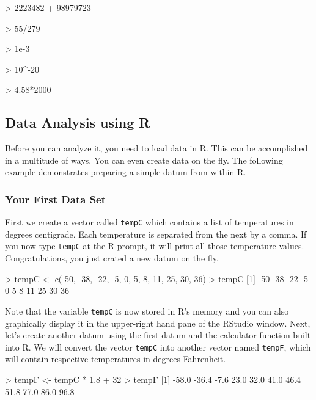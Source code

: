 \documentclass[11pt,twosided]{article}
\begin{document}
\begin{tcolorbox}[boxrule=0.5pt]
\begin{code}
> 2223482 + 98979723

> 55/279

> 1e-3

> 10^-20

> 4.58*2000

\end{code}
\end{tcolorbox}
\vspace{2ex}

\subsection{Data Analysis using R}

Before you can analyze it, you need to load data in R.  This can be accomplished in a multitude of ways.  You can even create data on the fly.  The following example demonstrates preparing a simple datum from within R.  

\subsubsection{Your First Data Set}
First we create a vector called {\tt tempC} which contains a list of temperatures in degrees centigrade.  Each temperature is separated from the next by a comma.  If you now type {\tt tempC} at the R prompt, it will print all those temperature values.  Congratulations, you just crated a new datum on the fly.\\

\begin{tcolorbox}[boxrule=0.5pt]
\begin{code}
> tempC <- c(-50, -38, -22, -5, 0, 5, 8, 11, 25, 30, 36)
> tempC
[1] -50 -38 -22  -5   0   5   8  11  25  30  36
\end{code}
\end{tcolorbox}
\vspace{2ex}

Note that the variable {\tt tempC} is now stored in R's memory and you can also graphically display it in the upper-right hand pane of the RStudio window.  Next, let's create another datum using the first datum and the calculator function built into R. We will convert the vector {\tt tempC} into another vector named {\tt tempF}, which will contain respective temperatures in degrees Fahrenheit.\\

\begin{tcolorbox}[boxrule=0.5pt]
\begin{code}
> tempF <- tempC * 1.8 + 32
> tempF
[1] -58.0 -36.4  -7.6  23.0  32.0  41.0  46.4  51.8  77.0  86.0  96.8
\end{code}
\end{tcolorbox}
\vspace{2ex}
\end{document}
